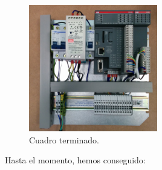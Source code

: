     \begin{figure}[H]
            \centering
            \includegraphics[width=0.5\textwidth]{images/cuadro/IMG_20150331_114950.jpg}
            \caption{Cuadro terminado.}
            \label{fig:cuad_montaje7}
    \end{figure}

Hasta el momento, hemos conseguido:

